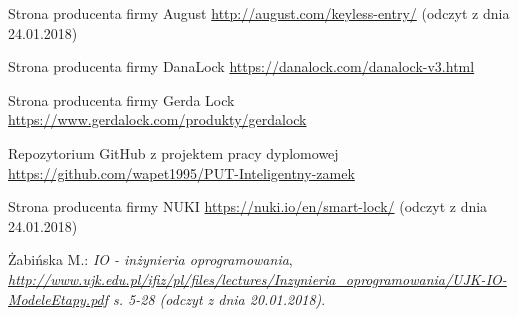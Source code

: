 \begin{thebibliography}{99}
     	 Strona producenta firmy August \href{http://august.com/keyless-entry/}{http://august.com/keyless-entry/} (odczyt z dnia 24.01.2018)
     	 
     	 Strona producenta firmy DanaLock \href{https://danalock.com/danalock-v3.html}{https://danalock.com/danalock-v3.html}
     	 
     	 Strona producenta firmy Gerda Lock \href{https://www.gerdalock.com/produkty/gerdalock}{https://www.gerdalock.com/produkty/gerdalock}

    	 Repozytorium GitHub z projektem pracy dyplomowej
    	 \href{https://github.com/wapet1995/PUT-Inteligentny-zamek}{https://github.com/wapet1995/PUT-Inteligentny-zamek}
    	  
    	 Strona producenta firmy NUKI \href{https://nuki.io/en/smart-lock/}{https://nuki.io/en/smart-lock/} (odczyt z dnia 24.01.2018)
    	 
    	 Żabińska M.: \textit{IO - inżynieria oprogramowania},\\
    	 \textit{\href{http://www.ujk.edu.pl/ifiz/pl/files/lectures/Inzynieria\_oprogramowania/UJK-IO-ModeleEtapy.pdf}{http://www.ujk.edu.pl/ifiz/pl/files/lectures/Inzynieria\_oprogramowania/UJK-IO-ModeleEtapy.pdf} s. 5-28 (odczyt z dnia 20.01.2018)}.
     \end{thebibliography}
 
